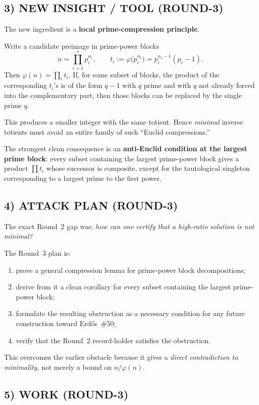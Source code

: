 \subsection*{3) NEW INSIGHT / TOOL (ROUND-3)}
The new ingredient is a \textbf{local prime-compression principle}.

Write a candidate preimage in prime-power blocks
\[
 n=\prod_{i=1}^r p_i^{\alpha_i},
 \qquad
 t_i:=\varphi\!\bigl(p_i^{\alpha_i}\bigr)=p_i^{\alpha_i-1}(p_i-1).
\]
Then $\varphi(n)=\prod_i t_i$. If, for some subset of blocks, the product of the corresponding $t_i$'s is of the form $q-1$ with $q$ prime and with $q$ not already forced into the complementary part, then those blocks can be replaced by the single prime $q$.

This produces a smaller integer with the same totient. Hence \emph{minimal} inverse totients must avoid an entire family of such ``Euclid compressions.''

The strongest clean consequence is an \textbf{anti-Euclid condition at the largest prime block}: every subset containing the largest prime-power block gives a product $\prod t_i$ whose successor is composite, except for the tautological singleton corresponding to a largest prime to the first power.

\subsection*{4) ATTACK PLAN (ROUND-3)}
The exact Round~2 gap was: \emph{how can one certify that a high-ratio solution is not minimal?}

The Round~3 plan is:
\begin{enumerate}
\item prove a general compression lemma for prime-power block decompositions;
\item derive from it a clean corollary for every subset containing the largest prime-power block;
\item formulate the resulting obstruction as a necessary condition for any future construction toward Erd\H{o}s~\#50;
\item verify that the Round~2 record-holder satisfies the obstruction.
\end{enumerate}

This overcomes the earlier obstacle because it gives a \emph{direct contradiction to minimality}, not merely a bound on $n/\varphi(n)$.

\subsection*{5) WORK (ROUND-3)}

